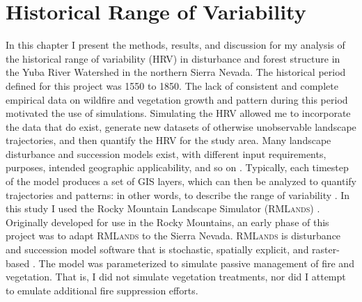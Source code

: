 
\chapter{Historical Range of Variability}
\label{ch:hrv}

In this chapter I present the methods, results, and discussion for my analysis of the historical range of variability (HRV) in disturbance and forest structure in the Yuba River Watershed in the northern Sierra Nevada. The historical period defined for this project was 1550 to 1850. The lack of consistent and complete empirical data on wildfire and vegetation growth and pattern during this period motivated the use of simulations. Simulating the HRV allowed me to incorporate the data that do exist, generate new datasets of otherwise unobservable landscape trajectories, and then quantify the HRV for the study area. Many landscape disturbance and succession models exist, with different input requirements, purposes, intended geographic applicability, and so on \citep{Keane2004}. Typically, each timestep of the model produces a set of GIS layers, which can then be analyzed to quantify trajectories and patterns: in other words, to describe the range of variability \citep{Keane2004}. In this study I used the Rocky Mountain Landscape Simulator (\textsc{RMLands}) \citep{McGarigal2001}. Originally developed for use in the Rocky Mountains, an early phase of this project was to adapt \textsc{RMLands} to the Sierra Nevada. \textsc{RMLands} is disturbance and succession model software that is stochastic, spatially explicit, and raster-based \citep{Cushman2011}. The model was parameterized to simulate passive management of fire and vegetation. That is, I did not simulate vegetation treatments, nor did I attempt to emulate additional fire suppression efforts.





